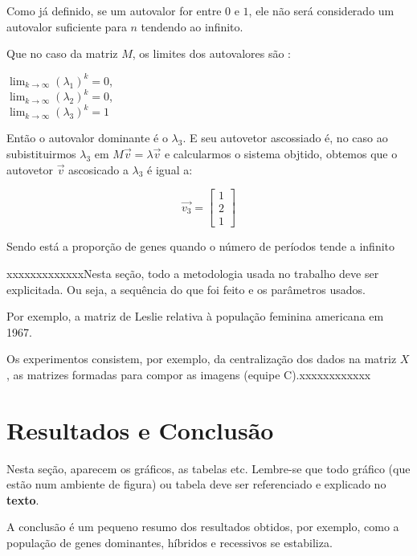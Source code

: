 \documentclass[a4paper,12pt]{article}
\begin{document}
Como já definido, se um autovalor for entre $0$ e $1$, ele não será considerado um autovalor suficiente para $n$ tendendo ao infinito.

Que no caso da matriz $M$, os limites dos autovalores são :
\begin{center}
    $\lim_{k\to\infty} (\lambda_1)^k = 0$,\\
    $\lim_{k\to\infty} (\lambda_2)^k = 0$,\\
    $\lim_{k\to\infty} (\lambda_3)^k = 1$
\end{center}

Então o autovalor dominante é o $\lambda_3$. E seu autovetor ascossiado é, no caso ao subistituirmos $\lambda_3$ em $M\vec{v} = \lambda \vec{v}$ e calcularmos o sistema objtido, obtemos que o autovetor $\vec{v}$ ascosicado a $\lambda_3$ é igual a:

\begin{displaymath}
\vec{v_3} = \begin{bmatrix}
1\\
2\\
1
\end{bmatrix}
\end{displaymath}

Sendo está a proporção de genes quando o número de períodos tende a infinito



xxxxxxxxxxxxxNesta seção, todo a metodologia usada no trabalho deve ser explicitada. Ou seja, a sequência do que foi feito e os parâmetros usados.

Por exemplo, a matriz de Leslie relativa à população feminina americana em 1967.

Os experimentos consistem, por exemplo, da centralização dos dados na matriz $X$, as matrizes formadas para compor as imagens (equipe C).xxxxxxxxxxxx



\section{Resultados e Conclusão}
\label{sec:resultados}

Nesta seção, aparecem os gráficos, as tabelas etc. Lembre-se que todo gráfico (que estão num ambiente de figura) ou tabela deve ser referenciado e explicado no \textbf{texto}.

A conclusão é um pequeno resumo dos resultados obtidos, por exemplo, como a população de genes dominantes, híbridos e recessivos se estabiliza.


% 

\end{document}

